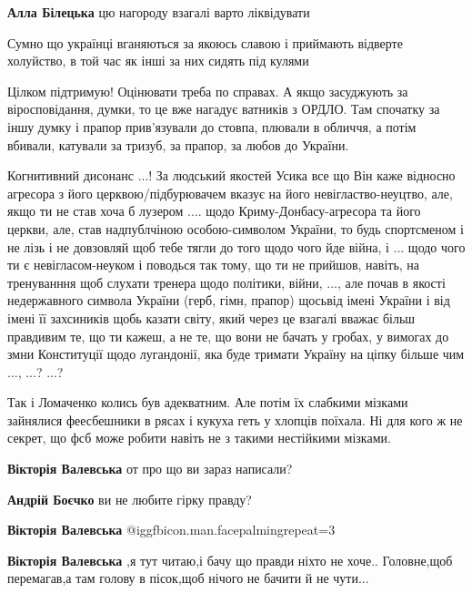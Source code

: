 \begin{itemize}
\begin{itemize} %
\textbf{Алла Білецька} цю нагороду взагалі варто ліквідувати
\end{itemize} %

Сумно що українці вганяються за якоюсь славою і приймають відверте холуйство, в той час як інші за них сидять під кулями


Цілком підтримую! Оцінювати треба по справах. А якщо засуджують за
віросповідання, думки, то це вже нагадує ватників з ОРДЛО. Там спочатку за іншу
думку і прапор прив'язували до стовпа, плювали в обличчя, а потім вбивали,
катували за тризуб, за прапор, за любов до України.


Когнитивний дисонанс ...! За людський якостей Усика все що Він каже відносно
агресора з його церквою/підбурювачем вказує на його невігластво-неуцтво, але,
якщо ти не став хоча б лузером .... щодо Криму-Донбасу-агресора та його церкви,
але, став надпублчіною особою-символом України, то будь спортсменом і не лізь і
не довзовляй щоб тебе тягли до того щодо чого йде війна, і ... щодо чого ти є
невігласом-неуком і поводься так тому, що ти не прийшов, навіть, на тренуванння
щоб слухати тренера щодо політики, війни, ..., але почав в якості недержавного
символа України (герб, гімн, прапор) щосьвід імені України і від імені її
захсиників щобь казати світу, який через це взагалі вважає більш правдивим те,
що ти кажеш, а не те, що вони не бачать у гробах, у вимогах до змни Конституції
щодо лугандонії, яка буде тримати Україну на ціпку більше чим ..., ...? ...?


Так і Ломаченко колись був адекватним. Але потім їх слабкими мізками зайнялися
феесбешники в рясах і кукуха геть у хлопців поїхала. Ні для кого ж не секрет,
що фсб може робити навіть не з такими нестійкими мізками.

\begin{itemize} %
\textbf{Вікторія Валевська} от про що ви зараз написали?

\textbf{Андрій Боєчко} ви не любите гірку правду?

\textbf{Вікторія Валевська}  @igg{fbicon.man.facepalming}{repeat=3} 

\textbf{Вікторія Валевська} ,я тут читаю,і бачу що правди ніхто не хоче.. Головне,щоб перемагав,а там голову в пісок,щоб нічого не бачити й не чути...
\end{itemize} %


\end{itemize}
